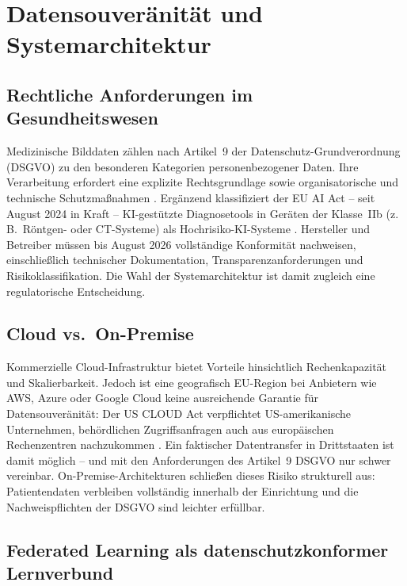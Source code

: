 \section{Datensouveränität und Systemarchitektur} \label{sec:inhouse}

\subsection{Rechtliche Anforderungen im Gesundheitswesen} \label{sec:anforderungen}

Medizinische Bilddaten zählen nach Artikel~9 der Datenschutz-Grundverordnung (DSGVO) zu
den besonderen Kategorien personenbezogener Daten. Ihre Verarbeitung erfordert eine
explizite Rechtsgrundlage sowie organisatorische und technische Schutzmaßnahmen
\cite{gdprMedical}. Ergänzend klassifiziert der EU AI Act -- seit August 2024 in Kraft --
KI-gestützte Diagnosetools in Geräten der Klasse~IIb (z.\,B.\ Röntgen- oder CT-Systeme)
als Hochrisiko-KI-Systeme \cite{euAiAct2024}. Hersteller und Betreiber müssen bis
August 2026 vollständige Konformität nachweisen, einschließlich technischer Dokumentation,
Transparenzanforderungen und Risikoklassifikation. Die Wahl der Systemarchitektur ist
damit zugleich eine regulatorische Entscheidung.

\subsection{Cloud vs.\ On-Premise} \label{sec:cloud_onpremise}

Kommerzielle Cloud-Infrastruktur bietet Vorteile hinsichtlich Rechenkapazität und
Skalierbarkeit. Jedoch ist eine geografisch \glqq EU-Region\grqq{} bei Anbietern wie
AWS, Azure oder Google Cloud keine ausreichende Garantie für Datensouveränität: Der
US CLOUD Act verpflichtet US-amerikanische Unternehmen, behördlichen Zugriffsanfragen
auch aus europäischen Rechenzentren nachzukommen \cite{gdprMedical}. Ein faktischer
Datentransfer in Drittstaaten ist damit möglich -- und mit den Anforderungen des
Artikel~9 DSGVO nur schwer vereinbar. On-Premise-Architekturen schließen dieses Risiko
strukturell aus: Patientendaten verbleiben vollständig innerhalb der Einrichtung und die
Nachweispflichten der DSGVO sind leichter erfüllbar.

\subsection{Federated Learning als datenschutzkonformer Lernverbund} \label{sec:federated}

